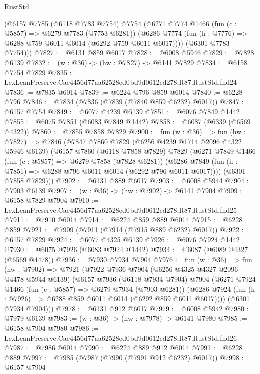 \begin{lexlean}{RustStd}
\begin{coremodule}
{{      (@6157
        @7785
        (@6118 @7783 @7754)
        @7754
        (@6271
          @7774
          @1466
          (fun (c : @5857) => @6279 @7783 (@7753 @6281))
          (@6286 @7774 (fun (h : @7776) => @6288 @759 @6011 @6014 (@6292 @759 @6011 @6017))))
        (@6301 @7783 @7754)))
@7827 := @6131 @859 @6017
@7828 := @6008 @5946
@7829 := @7828 @6139
@7832 := (w : @36) -> (hw : @7827) -> @6141 @7829
@7834 := @6158 @7754 @7829
@7835 := LexLeanPreserve.Cae4456d77aa62528ed0bd9d0612cd278.R87.RustStd.fnd24
@7836 := @7835 @6014
@7839 := @6224 @796 @859 @6014
@7840 := @6228 @796
@7846 := @7834 (@7836 (@7839 (@7840 @859 @6232) @6017))
@7847 := @6157 @7754
@7849 := @6077 @4239 @6139
@7851 := @6076 @7849 @1442
@7855 := @6075 @7851 (@6083 @7849 @1442)
@7858 := @6087 (@6339 (@6569 @4322))
@7860 := @7855 @7858 @7829
@7900 := fun (w : @36) =>
  fun (hw : @7827) =>
  @7846
    (@7847
      @7860
      @7829
      (@6256 @4239 @1714 @2096 @4322 @5946 @6139)
      (@6157
        @7860
        (@6118 @7858 @7829)
        @7829
        (@6271
          @7849
          @1466
          (fun (c : @5857) => @6279 @7858 (@7828 @6281))
          (@6286 @7849 (fun (h : @7851) => @6288 @796 @6011 @6014 (@6292 @796 @6011 @6017))))
        (@6301 @7858 @7829)))
@7902 := @6131 @889 @6017
@7903 := @6008 @5944
@7904 := @7903 @6139
@7907 := (w : @36) -> (hw : @7902) -> @6141 @7904
@7909 := @6158 @7829 @7904
@7910 := LexLeanPreserve.Cae4456d77aa62528ed0bd9d0612cd278.R87.RustStd.fnd25
@7911 := @7910 @6014
@7914 := @6224 @859 @889 @6014
@7915 := @6228 @859
@7921 := @7909 (@7911 (@7914 (@7915 @889 @6232) @6017))
@7922 := @6157 @7829
@7924 := @6077 @4325 @6139
@7926 := @6076 @7924 @1442
@7930 := @6075 @7926 (@6083 @7924 @1442)
@7934 := @6087 (@6089 @4327 (@6569 @4478))
@7936 := @7930 @7934 @7904
@7976 := fun (w : @36) =>
  fun (hw : @7902) =>
  @7921
    (@7922
      @7936
      @7904
      (@6256 @4325 @4327 @2096 @4478 @5944 @6139)
      (@6157
        @7936
        (@6118 @7934 @7904)
        @7904
        (@6271
          @7924
          @1466
          (fun (c : @5857) => @6279 @7934 (@7903 @6281))
          (@6286 @7924 (fun (h : @7926) => @6288 @859 @6011 @6014 (@6292 @859 @6011 @6017))))
        (@6301 @7934 @7904)))
@7978 := @6131 @912 @6017
@7979 := @6008 @5942
@7980 := @7979 @6139
@7983 := (w : @36) -> (hw : @7978) -> @6141 @7980
@7985 := @6158 @7904 @7980
@7986 := LexLeanPreserve.Cae4456d77aa62528ed0bd9d0612cd278.R87.RustStd.fnd26
@7987 := @7986 @6014
@7990 := @6224 @889 @912 @6014
@7991 := @6228 @889
@7997 := @7985 (@7987 (@7990 (@7991 @912 @6232) @6017))
@7998 := @6157 @7904
}}
\end{coremodule}
\end{lexlean}
